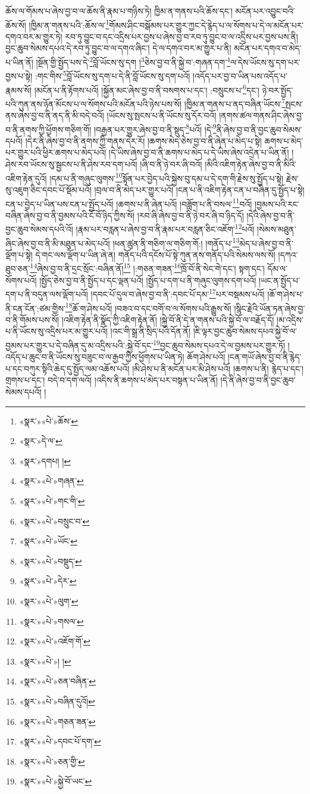 ཆོས་ལ་གོམས་པ་ཞེས་བྱ་བ་ལ་ཆོས་ནི་རྣམ་པ་གཉིས་ཏེ། ཁྱིམ་ན་གནས་པའི་ཆོས་དང་། མངོན་པར་འབྱུང་བའི་ཆོས་སོ། །ཁྱིམ་ན་གནས་པའི་:ཆོས་ལ་\footnote{«སྣར་»«པེ་»ཆོས་}གོམས་ཤིང་བསྒོམས་པར་གྱུར་ཀྱང་དེ་རྙེད་པ་ལ་སོགས་པ་དེ་ལ་མངོན་པར་དགའ་བར་མ་གྱུར་ཏེ། རབ་ཏུ་བྱུང་བ་དང་འདྲིས་པར་བྱས་པ་ཞེས་བྱ་བ་རབ་ཏུ་བྱུང་བ་ལ་འདྲིས་པར་བྱས་པས་ནི། བྱང་ཆུབ་སེམས་དཔའ་དེ་རབ་ཏུ་བྱུང་བ་ལ་དགའ་ཞིང་། དེ་ལ་དགའ་བར་མ་གྱུར་པ་ནི། མངོན་པར་དགའ་བ་མེད་པ་ཡིན་ནོ། །སྔོན་གྱི་སྤྱོད་པས་དེ་\footnote{«སྣར་»དེ་ལ་}བློ་ཡོངས་སུ་དག །\footnote{«སྣར་»དགཔ། །}ཅེས་བྱ་བ་ནི་སྐྱེ་བ་:གཞན་དག་\footnote{«སྣར་»«པེ་»གཞན་}ལ་དེས་ཡོངས་སུ་དག་པར་བྱས་པ་སྟེ། :གང་གིས་\footnote{«སྣར་»«པེ་»གང་གི་}བློ་ཡོངས་སུ་དག་པ་དེ་ནི་བློ་ཡོངས་སུ་དག་པའོ། །འདོད་པར་བྱ་བ་ཡིན་པས་འདོད་པ་རྣམས་སོ། །མངོན་པ་ནི་རྟོགས་པའོ། །སྐྱོན་མང་ཞེས་བྱ་བ་ནི་བསགས་པ་དང་། :བསྲུངས་པ་\footnote{«སྣར་»«པེ་»བསྲུང་བ་}དང་། ཉེ་བར་སྤྱོད་པའི་ཀུན་ནས་ཉོན་མོངས་པ་ལ་སོགས་པའི་མངོན་པའི་ཉེས་པས་སོ། །ཁྱིམ་ན་གནས་པ་ནད་བཞིན་ཡོངས་\footnote{«སྣར་»«པེ་»ཡོང་}སྤངས་ནས་ཞེས་བྱ་བ་ནི་ནད་ནི་མི་བདེ་བའོ། །ཡོངས་སུ་སྤངས་པ་ནི་ཡོངས་སུ་དོར་བའོ། །ནགས་ཚལ་གནས་ཤིང་ཞེས་བྱ་བ་ནི་ནགས་ཀྱི་ཕྱོགས་གཅིག་གོ། །བརྒྱན་པར་གྱུར་ཞེས་བྱ་བ་ནི་སྡུད་\footnote{«སྣར་»«པེ་»བསྡུད་}པའོ། །དེ་\footnote{«སྣར་»«པེ་»དེར་}ནི་ཞེས་བྱ་བ་ནི་བྱང་ཆུབ་སེམས་དཔའོ། །དེར་ནི་ཞེས་བྱ་བ་ནི་ནགས་ཀྱི་གནས་དེར་རོ། །ཆགས་མེད་ཅེས་བྱ་བ་ནི་ཞེན་པ་མེད་པ་སྟེ། ཆགས་པ་མེད་པར་གྱུར་པའི་ཕྱིར་ཆགས་པ་མེད་པའོ། །དེ་ཡིས་ཞེས་བྱ་བ་ནི་ཆགས་པ་མེད་པ་དེ་ཡིས་ཞེས་འདྲེན་པ་ཡིན་ནོ། །ཤེས་རབ་ཡོངས་སུ་སྦྱངས་པ་ནི་ཤེས་རབ་དག་པའོ། །ཞི་བ་ནི་ཉེ་བར་ཞི་བའོ། །མིའི་འཇིག་རྟེན་ཞེས་བྱ་བ་ནི་མིའི་འཇིག་རྟེན་དུའོ། །དམ་པ་ནི་གཞུང་ལུགས་\footnote{«སྣར་»«པེ་»ལུག་}སྟོན་པར་བྱེད་པའི་སྐྱེས་བུ་དམ་པ་དེ་དག་གི་རྗེས་སུ་སྤྱོད་པ་སྟེ། རྗེས་སུ་འཇུག་ཅིང་དབང་པོ་སྡོམ་པའོ། །བྲལ་བ་ནི་མེད་པར་གྱུར་པའོ། །ངན་པ་ནི་འཇིག་རྟེན་ངན་པ་བཞིན་དུ་སྤྱོད་པ་སྟེ། ངན་པ་བྱེད་པ་ཡིན་པས་ངན་པ་སྤྱོད་པའོ། །ཆགས་པ་ནི་ཞེན་པའོ། །བཟློག་པ་ནི་བསལ་\footnote{«སྣར་»«པེ་»གསལ་}བའོ། །བྱམས་པའི་རང་བཞིན་ཞེས་བྱ་བ་ནི་བྱམས་པའི་ངོ་བོ་ཉིད་ཀྱིས་སོ། །རབ་ཞི་ཞེས་བྱ་བ་ནི་ཉེ་བར་ཞི་བ་ཉིད་དོ། །དེའི་ཞེས་བྱ་བ་ནི་བྱང་ཆུབ་སེམས་དཔའི་འོ། །རྣམ་པར་བརླན་པ་ཞེས་བྱ་བ་ནི་རྣམ་པར་བརླན་ཅིང་འཇོག་\footnote{«སྣར་»«པེ་»འཇོག་གོ་}པའོ། །སེམས་མཐུན་ཞིང་ཞེས་བྱ་བ་ནི་མི་མཐུན་པ་མེད་པའོ། །ཕན་ཚུན་ནི་གཅིག་ལ་གཅིག་གོ:། །གནོད་པ་\footnote{«སྣར་»«པེ་»། །}མེད་པ་ཞེས་བྱ་བ་ནི་ལྡོག་པ་སྟེ། དེ་གང་ལས་ལྡོག་པ་ཡིན་ཞེ་ན། གནོད་པའི་དངོས་པོ་སྟེ་ཀུན་ནས་གནོད་པའི་སེམས་ལས་སོ། །དཀའ་ཐུབ་ཅན་\footnote{«སྣར་»«པེ་»ཅན་བཞིན་}ཞེས་བྱ་བ་ནི་དྲང་སྲོང་:བཞིན་ནོ།\footnote{«སྣར་»«པེ་»བཞིན་དུའོ།} །:གཅན་གཟན་\footnote{«སྣར་»«པེ་»གཅན་ཟན་}ཁྲོ་བོ་ནི་སེང་གེ་དང་། སྟག་དང་། དོམ་ལ་སོགས་པའོ། །སྤྱོད་ཅེས་བྱ་བ་ནི་སྤྱོད་པ་དང་ལྡན་པའོ། །སྤྱོད་པ་དག་པ་ནི་གཞུང་ལུགས་དག་པའོ། །ཡང་ན་སྤྱོད་པ་དག་པ་ནི་བདུན་ལས་ལྡོག་པའོ། །དབང་པོ་དུལ་བ་ཞེས་བྱ་བ་ནི་:དབང་པོ་དམ་\footnote{«སྣར་»«པེ་»དབང་པོ་དག་}པར་བསྡམས་པའོ། །ཆོ་ག་ཤེས་པ་ནི་ངན་ངོན་:ཙམ་གྱིས་\footnote{«སྣར་»«པེ་»ཅན་གྱི་}ཆོ་ག་ཤེས་པའོ། །བཟའ་བ་དང་བགོ་བ་ལ་སོགས་པའི་རྒྱུས་སོ། །སྙིང་རྗེའི་ཡོན་ཏན་ཞེས་བྱ་བ་ནི་གོམས་པས་སོ། །འཇིག་རྟེན་ནི་སྣོད་ཀྱི་འཇིག་རྟེན་ནོ། །སྐྱེ་བོ་ནི་དེ་ན་གནས་པའི་སྐྱེ་བོ་ལ་བརྗོད་དོ། །མ་འདྲིས་པ་ནི་ཡོངས་སུ་འདྲིས་པར་མ་གྱུར་པའོ། །འང་གི་སྒྲ་ནི་སྲིད་པའི་དོན་ནོ། །ཇི་ལྟར་བྱང་ཆུབ་སེམས་དཔའ་སྐྱེ་བོ་ལ་བྱམས་པར་གྱུར་པ་དེ་བཞིན་དུ་མ་འདྲིས་པའི་:སྐྱེ་བོ་དང་\footnote{«སྣར་»«པེ་»སྐྱེ་བོ་ཡང་}བྱང་ཆུབ་སེམས་དཔའ་དེ་ལ་བྱམས་པར་གྱུར་ཏོ། །འདོད་པ་ཆུང་བ་ནི་ཡོངས་སུ་བཟུང་བ་ལ་རྒྱབ་ཀྱིས་ཕྱོགས་པ་ཡིན་ཏེ། ཆོག་ཤེས་པའོ། །ངན་གཡོ་ཞེས་བྱ་བ་ནི་རྙེད་པ་དང་བཀུར་སྟིའི་ཆེད་དུ་སྤྱོད་ལམ་འཆོས་པའོ། །མི་ཤེས་པ་ནི་མངོན་པར་མི་ཤེས་པའོ། །ཆགས་པ་ནི། རྙེད་པ་དང་། གྲགས་པ་དང་། བདེ་བ་དག་ལའོ། །འདིས་ནི་ཆགས་པ་མེད་པར་བསྟན་པ་ཡིན་ནོ། །དེ་ནི་ཞེས་བྱ་བ་ནི་བྱང་ཆུབ་སེམས་དཔའོ། །
